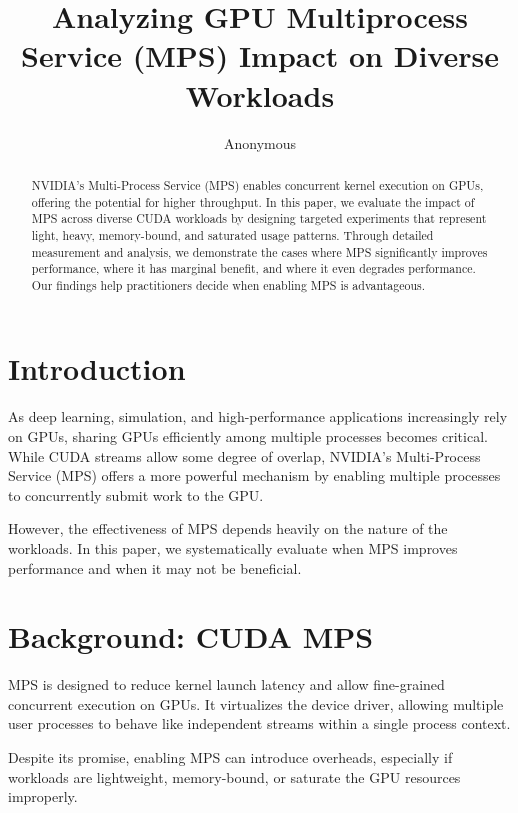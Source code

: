 \documentclass[sigconf]{acmart}
\begin{document}
\title{Analyzing GPU Multiprocess Service (MPS) Impact on Diverse Workloads}

\author{Anonymous}

\begin{abstract}
NVIDIA's Multi-Process Service (MPS) enables concurrent kernel execution on GPUs, offering the potential for higher throughput. In this paper, we evaluate the impact of MPS across diverse CUDA workloads by designing targeted experiments that represent light, heavy, memory-bound, and saturated usage patterns. Through detailed measurement and analysis, we demonstrate the cases where MPS significantly improves performance, where it has marginal benefit, and where it even degrades performance. Our findings help practitioners decide when enabling MPS is advantageous.
\end{abstract}

\maketitle

\section{Introduction}

As deep learning, simulation, and high-performance applications increasingly rely on GPUs, sharing GPUs efficiently among multiple processes becomes critical. While CUDA streams allow some degree of overlap, NVIDIA's Multi-Process Service (MPS) offers a more powerful mechanism by enabling multiple processes to concurrently submit work to the GPU.

However, the effectiveness of MPS depends heavily on the nature of the workloads. In this paper, we systematically evaluate when MPS improves performance and when it may not be beneficial.

\section{Background: CUDA MPS}

MPS is designed to reduce kernel launch latency and allow fine-grained concurrent execution on GPUs. It virtualizes the device driver, allowing multiple user processes to behave like independent streams within a single process context.

Despite its promise, enabling MPS can introduce overheads, especially if workloads are lightweight, memory-bound, or saturate the GPU resources improperly.
\end{document}
